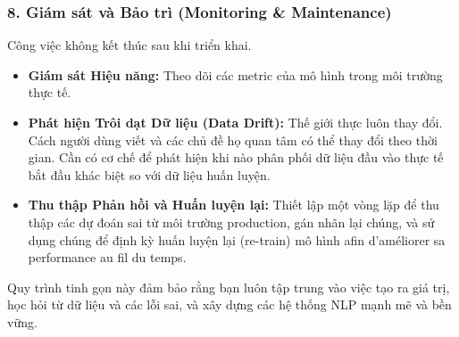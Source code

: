 \subsubsection{8. Giám sát và Bảo trì (Monitoring \& Maintenance)}
Công việc không kết thúc sau khi triển khai.
\begin{itemize}
    \item \textbf{Giám sát Hiệu năng:} Theo dõi các metric của mô hình trong môi trường thực tế.
    \item \textbf{Phát hiện Trôi dạt Dữ liệu (Data Drift):} Thế giới thực luôn thay đổi. Cách người dùng viết và các chủ đề họ quan tâm có thể thay đổi theo thời gian. Cần có cơ chế để phát hiện khi nào phân phối dữ liệu đầu vào thực tế bắt đầu khác biệt so với dữ liệu huấn luyện.
    \item \textbf{Thu thập Phản hồi và Huấn luyện lại:} Thiết lập một vòng lặp để thu thập các dự đoán sai từ môi trường production, gán nhãn lại chúng, và sử dụng chúng để định kỳ huấn luyện lại (re-train) mô hình afin d'améliorer sa performance au fil du temps.
\end{itemize}
Quy trình tinh gọn này đảm bảo rằng bạn luôn tập trung vào việc tạo ra giá trị, học hỏi từ dữ liệu và các lỗi sai, và xây dựng các hệ thống NLP mạnh mẽ và bền vững.